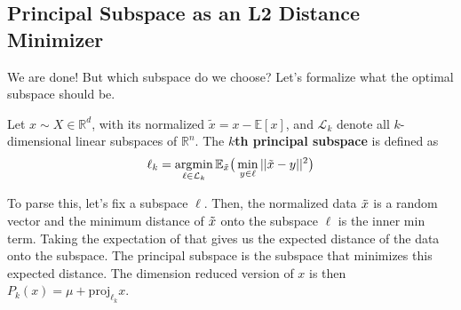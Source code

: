 \subsection{Principal Subspace as an L2 Distance Minimizer}

  We are done! But which subspace do we choose? Let's formalize what the optimal subspace should be. 

  \begin{definition}
    Let $x \sim X \in \mathbb{R}^d$, with its normalized $\tilde{x} = x - \mathbb{E}[x]$, and $\mathcal{L}_k$ denote all $k$-dimensional linear subspaces of $\mathbb{R}^n$. The \textbf{$k$th principal subspace} is defined as 
    \begin{equation}
      \ell_k = \operatorname*{\arg\!\min}_{\ell \in \mathcal{L}_k} \mathbb{E}_{\Tilde{x}} \big( \min_{y \in \ell} ||\Tilde{x} - y||^2 \big)
    \end{equation}

    To parse this, let's fix a subspace $\ell$. Then, the normalized data $\Tilde{x}$ is a random vector and the minimum distance of $\Tilde{x}$ onto the subspace $\ell$ is the inner min term. Taking the expectation of that gives us the expected distance of the data onto the subspace. The principal subspace is the subspace that minimizes this expected distance. The dimension reduced version of $x$ is then $P_k (x) = \mu + \mathrm{proj}_{\ell_k} x$. 

    \begin{figure}[H]
      \centering
      \begin{subfigure}[b]{0.4\textwidth}
      \centering
\end{subfigure}
\end{figure}
\end{definition}
